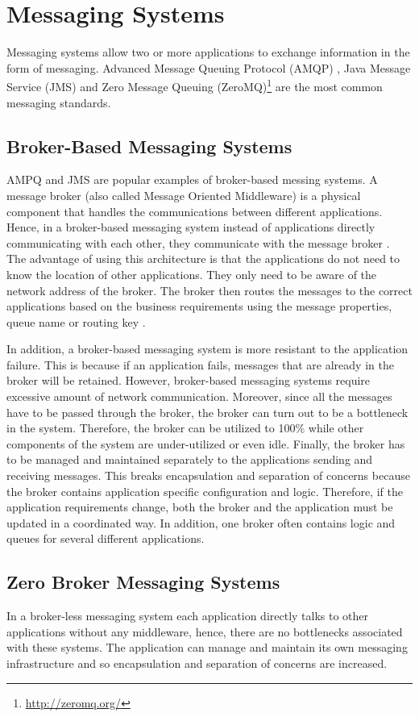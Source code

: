 \documentclass[a4paper,11pt,twoside]{report}
\begin{document}
\section{Messaging Systems} \label{MOM}
Messaging systems allow two or more applications to exchange information in the form of messaging. Advanced Message Queuing Protocol (AMQP) \cite{AMPQ}, Java Message Service (JMS) \cite{JMS} and Zero Message Queuing (ZeroMQ)\footnote{\label{ZeroMQ_1} \url{http://zeromq.org/}} are the most common messaging standards. 

\subsection{Broker-Based Messaging Systems} 
AMPQ and JMS are popular examples of broker-based messing systems. A message broker (also called Message Oriented Middleware) is a physical component that handles the communications between different applications. Hence, in a broker-based messaging system instead of applications directly communicating with each other, they communicate with the message broker \cite{broker}. The advantage of using this architecture is that the applications do not need to know the location of other applications. They only need to be aware of the network address of the broker. The broker then routes the messages to the correct applications based on the business requirements using the message properties, queue name or routing key \cite{AMPQ}. 

In addition, a broker-based messaging system is more resistant to the application failure. This is because if an application fails, messages that are already in the broker will be retained. However, broker-based messaging systems require excessive amount of network communication. Moreover, since all the messages have to be passed through the broker, the broker can turn out to be a bottleneck in the system. Therefore, the broker can be utilized to 100\% while other components of the system are under-utilized or even idle. Finally, the broker has to be managed and maintained separately to the applications sending and receiving messages. This breaks encapsulation and separation of concerns because the broker contains application specific configuration and logic. Therefore, if the application requirements change, both the broker and the application must be updated in a coordinated way. In addition, one broker often contains logic and queues for several different applications.

\subsection{Zero Broker Messaging Systems} 
In a broker-less messaging system each application directly talks to other applications without any middleware, hence, there are no bottlenecks associated with these systems. The application can manage and maintain its own messaging infrastructure and so encapsulation and separation of concerns are increased.
\end{document}
